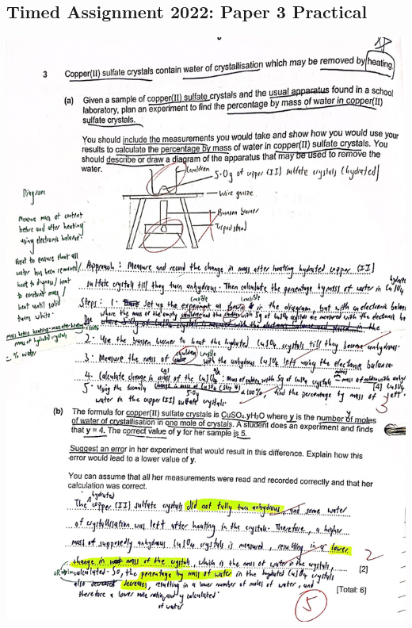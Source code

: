 \documentclass[oneside]{book}
\begin{document}
    \subsection{Timed Assignment 2022: Paper 3 Practical} \begin{center}
        \includegraphics[width=\textwidth,height=\textheight,keepaspectratio]{images/AAC51764-8AB3-4F2E-86DA-AA8B61CADE87.jpeg}
    \end{center}
    \newpage
\end{document}
